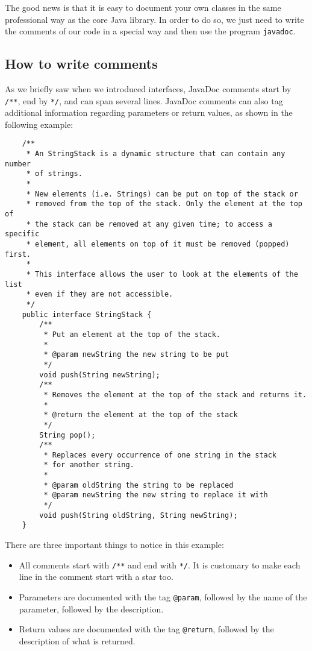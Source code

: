 The good news is that it is easy to document your own classes in the
same professional way as the core Java library. In order to do so, we
just need to write the comments of our code in a special way and then
use the program \verb+javadoc+. 

\subsection{How to write comments}
\label{sec:writing-comments}

As we briefly saw when we introduced interfaces, JavaDoc comments
start by \verb+/**+, end by \verb+*/+, and can span several
lines. JavaDoc comments can also tag additional information regarding
parameters or return values, as shown in the following example: 

\begin{verbatim}
    /**
     * An StringStack is a dynamic structure that can contain any number
     * of strings. 
     * 
     * New elements (i.e. Strings) can be put on top of the stack or
     * removed from the top of the stack. Only the element at the top of
     * the stack can be removed at any given time; to access a specific 
     * element, all elements on top of it must be removed (popped) first. 
     * 
     * This interface allows the user to look at the elements of the list
     * even if they are not accessible. 
     */
    public interface StringStack {
        /**
         * Put an element at the top of the stack. 
         *
         * @param newString the new string to be put
         */
        void push(String newString);
        /**
         * Removes the element at the top of the stack and returns it. 
         *
         * @return the element at the top of the stack
         */
        String pop();
        /**
         * Replaces every occurrence of one string in the stack
         * for another string. 
         *
         * @param oldString the string to be replaced
         * @param newString the new string to replace it with
         */
        void push(String oldString, String newString);
    }
\end{verbatim}

There are three important things to notice in this example: 

\begin{itemize}
\item All comments start with \verb+/**+ and end with \verb+*/+. It is
  customary to make each line in the comment start with a star too.
\item Parameters are documented with the tag \verb+@param+, followed
  by the name of the parameter, followed by the description.
\item Return values are documented with the tag \verb+@return+,
  followed by the description of what is returned. 
\end{itemize}

